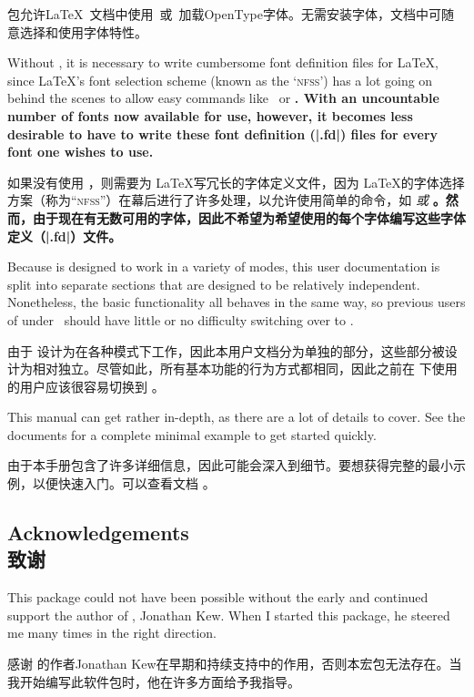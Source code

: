 \documentclass[a4paper]{l3doc}
\begin{document}
包允许\LaTeX\ 文档中使用\XeTeX\ 或\LuaTeX\ 加载OpenType字体。无需安装字体，文档中可随意选择和使用字体特性。

Without , it is necessary to write cumbersome font definition
files for \LaTeX, since \LaTeX's font selection scheme (known as the
`\textsc{nfss}') has a lot going on behind the scenes to allow easy
commands like \cmd\emph\ or \cmd\bfseries. With an uncountable number of
fonts now available for use, however, it becomes less desirable to have to
write these font definition (|.fd|) files for every font one wishes to use.

如果没有使用 ，则需要为 \LaTeX 写冗长的字体定义文件，因为 \LaTeX 的字体选择方案（称为“\textsc{nfss}”）在幕后进行了许多处理，以允许使用简单的命令，如 \cmd\emph 或 \cmd\bfseries。然而，由于现在有无数可用的字体，因此不希望为希望使用的每个字体编写这些字体定义（|.fd|）文件。


Because  is designed to work in a variety of modes, this
user documentation is split into separate sections that are designed to be
relatively independent. Nonetheless, the basic functionality all behaves in
the same way, so previous users of  under \XeTeX\ should have
little or no difficulty switching over to \LuaTeX.

由于  设计为在各种模式下工作，因此本用户文档分为单独的部分，这些部分被设计为相对独立。尽管如此，所有基本功能的行为方式都相同，因此之前在 \XeTeX 下使用  的用户应该很容易切换到 \LuaTeX。

This manual can get rather in-depth, as there are a lot of details
to cover. See the documents  for a complete minimal example
to get started quickly.

由于本手册包含了许多详细信息，因此可能会深入到细节。要想获得完整的最小示例，以便快速入门。可以查看文档 。

\subsection{Acknowledgements\\致谢}

This package could not have been possible without the early and continued support
the author of \XeTeX, Jonathan Kew. When I started this package, he steered
me many times in the right direction.

感谢 \XeTeX 的作者Jonathan Kew在早期和持续支持中的作用，否则本宏包无法存在。当我开始编写此软件包时，他在许多方面给予我指导。
\end{document}
